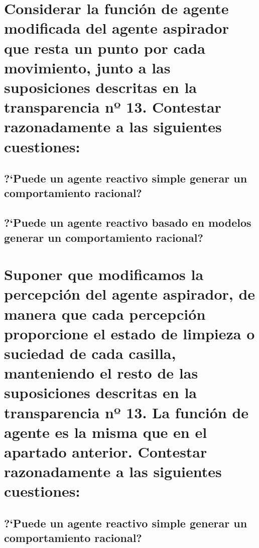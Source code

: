 \documentclass[10pt, a4paper,spanish]{article}
\begin{document}
		\paragraph{}



	\section{Considerar la función de agente modificada del agente aspirador que resta un punto por cada movimiento, junto a las suposiciones descritas en la transparencia nº 13. Contestar razonadamente a las siguientes cuestiones:}


		\subsection{?`Puede un agente reactivo simple generar un comportamiento racional?}

			\paragraph{}


		\subsection{?`Puede un agente reactivo basado en modelos generar un comportamiento racional?}

			\paragraph{}



	\section{Suponer que modificamos la percepción del agente aspirador, de manera que cada percepción proporcione el estado de limpieza o suciedad de cada casilla, manteniendo el resto de las suposiciones descritas en la transparencia nº 13. La función de agente es la misma que en el apartado anterior. Contestar razonadamente a las siguientes cuestiones:}


		\subsection{?`Puede un agente reactivo simple generar un comportamiento racional?}

			\paragraph{}
\end{document}
